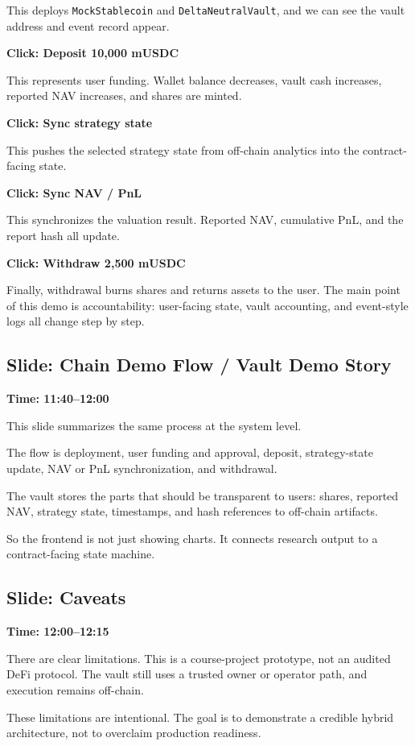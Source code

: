 \documentclass[11pt]{article}
\begin{document}
This deploys \texttt{MockStablecoin} and \texttt{DeltaNeutralVault}, and we can see the vault address and event record appear.

\textbf{Click: Deposit 10,000 mUSDC}

This represents user funding. Wallet balance decreases, vault cash increases, reported NAV increases, and shares are minted.

\textbf{Click: Sync strategy state}

This pushes the selected strategy state from off-chain analytics into the contract-facing state.

\textbf{Click: Sync NAV / PnL}

This synchronizes the valuation result. Reported NAV, cumulative PnL, and the report hash all update.

\textbf{Click: Withdraw 2,500 mUSDC}

Finally, withdrawal burns shares and returns assets to the user. The main point of this demo is accountability: user-facing state, vault accounting, and event-style logs all change step by step.

\subsection*{Slide: Chain Demo Flow / Vault Demo Story}
\textbf{Time: 11:40--12:00}

This slide summarizes the same process at the system level.

The flow is deployment, user funding and approval, deposit, strategy-state update, NAV or PnL synchronization, and withdrawal.

The vault stores the parts that should be transparent to users: shares, reported NAV, strategy state, timestamps, and hash references to off-chain artifacts.

So the frontend is not just showing charts. It connects research output to a contract-facing state machine.

\subsection*{Slide: Caveats}
\textbf{Time: 12:00--12:15}

There are clear limitations. This is a course-project prototype, not an audited DeFi protocol. The vault still uses a trusted owner or operator path, and execution remains off-chain.

These limitations are intentional. The goal is to demonstrate a credible hybrid architecture, not to overclaim production readiness.
\end{document}

